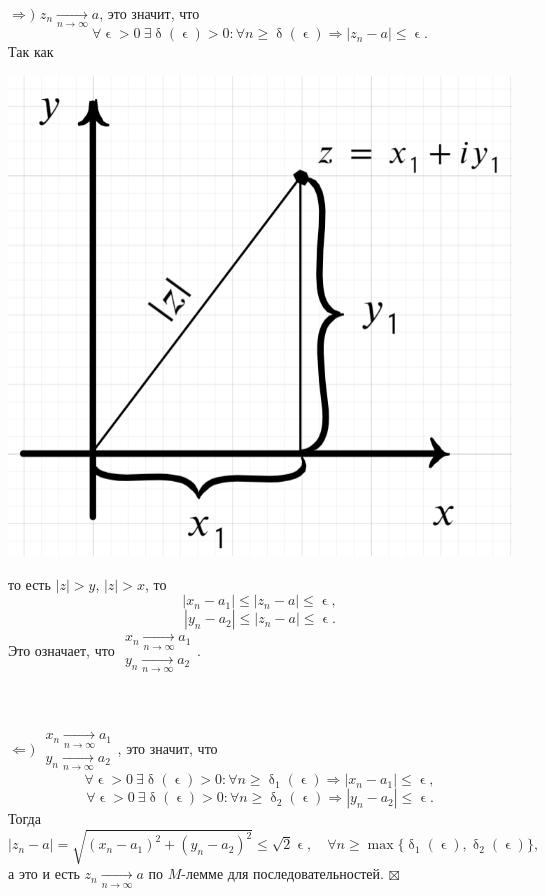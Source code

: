 \documentclass[a4paper, 12pt]{article}
\newenvironment{Proof} %
{\par\noindent{$\blacklozenge$}} %
{\hfill$\scriptstyle\boxtimes$}
\renewcommand{\delta}{\updelta}
\renewcommand{\epsilon}{\upvarepsilon}
\newcommand{\limdef}{\forall \epsilon >0\ \exists \delta (\epsilon) > 0}
\begin{document}
\begin{Proof}
	$\Rightarrow)$ $z_n \underset{n\to\infty}{\longrightarrow} a$, это значит, что $$\limdef : \forall n \geqslant \delta (\epsilon)\Rightarrow |z_n - a| \leqslant \epsilon.$$
	Так как\\
	\noindent
	\parbox[b][4.5cm][t]{10mm}{
		\includegraphics[scale=0.25]{images/015.png}}
	\hfill
	\parbox[b][4cm][t]{100mm}{	то есть $|z| > y$, $|z|>x$, то $$|x_n - a_1|\leqslant |z_n - a|\leqslant \epsilon,$$
		$$|y_n - a_2|\leqslant |z_n - a|\leqslant \epsilon.$$
		Это означает, что $\begin{matrix}
			x_n\underset{n\to\infty}{\longrightarrow}a_1\\
			y_n\underset{n\to\infty}{\longrightarrow}a_2
		\end{matrix}$.
		}\\\\
	$\Leftarrow)$ $\begin{matrix}
		x_n\underset{n\to\infty}{\longrightarrow}a_1\\
		y_n\underset{n\to\infty}{\longrightarrow}a_2
	\end{matrix}$, это значит, что $$\limdef : \forall n \geqslant \delta_1 (\epsilon)\Rightarrow |x_n - a_1| \leqslant \epsilon,$$
$$\limdef : \forall n \geqslant \delta_2 (\epsilon)\Rightarrow |y_n - a_2| \leqslant \epsilon.$$
Тогда $$|z_n - a| = \sqrt{(x_n - a_1)^2 + (y_n-a_2)^2}\leqslant \sqrt{2}\epsilon,\quad \forall n \geqslant \max\{\delta _1(\epsilon), \delta_2(\epsilon)\},$$
а это и есть $z_n \underset{n\to\infty}{\longrightarrow}a$ по $M$-лемме для последовательностей.
\end{Proof}\\\\
\end{document}
